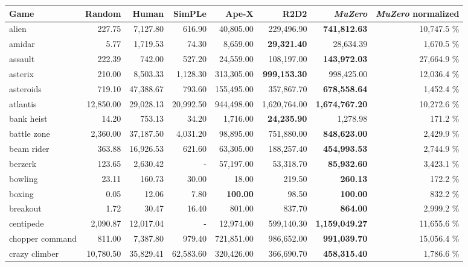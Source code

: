 \documentclass{article}
\newcommand{\muzero}{\emph{MuZero}}
\begin{document}
\begin{table}
\scriptsize

\begin{center}\begin{tabularx}{0.900000\textwidth}{X| r r r r r r r}
\toprule
Game & Random & Human & SimPLe \cite{kaiser:simple} & Ape-X \cite{apex} & R2D2 \cite{r2d2} & \muzero{} & \muzero{} normalized  \\
\midrule
alien &227.75 & 7,127.80 & 616.90 & 40,805.00 & 229,496.90 & \textbf{741,812.63} & 10,747.5 \%\\
amidar &5.77 & 1,719.53 & 74.30 & 8,659.00 & \textbf{29,321.40} & 28,634.39 & 1,670.5 \%\\
assault &222.39 & 742.00 & 527.20 & 24,559.00 & 108,197.00 & \textbf{143,972.03} & 27,664.9 \%\\
asterix &210.00 & 8,503.33 & 1,128.30 & 313,305.00 & \textbf{999,153.30} & 998,425.00 & 12,036.4 \%\\
asteroids &719.10 & 47,388.67 & 793.60 & 155,495.00 & 357,867.70 & \textbf{678,558.64} & 1,452.4 \%\\
atlantis &12,850.00 & 29,028.13 & 20,992.50 & 944,498.00 & 1,620,764.00 & \textbf{1,674,767.20} & 10,272.6 \%\\
bank heist &14.20 & 753.13 & 34.20 & 1,716.00 & \textbf{24,235.90} & 1,278.98 & 171.2 \%\\
battle zone &2,360.00 & 37,187.50 & 4,031.20 & 98,895.00 & 751,880.00 & \textbf{848,623.00} & 2,429.9 \%\\
beam rider &363.88 & 16,926.53 & 621.60 & 63,305.00 & 188,257.40 & \textbf{454,993.53} & 2,744.9 \%\\
berzerk &123.65 & 2,630.42 & - & 57,197.00 & 53,318.70 & \textbf{85,932.60} & 3,423.1 \%\\
bowling &23.11 & 160.73 & 30.00 & 18.00 & 219.50 & \textbf{260.13} & 172.2 \%\\
boxing &0.05 & 12.06 & 7.80 & \textbf{100.00} & 98.50 & \textbf{100.00} & 832.2 \%\\
breakout &1.72 & 30.47 & 16.40 & 801.00 & 837.70 & \textbf{864.00} & 2,999.2 \%\\
centipede &2,090.87 & 12,017.04 & - & 12,974.00 & 599,140.30 & \textbf{1,159,049.27} & 11,655.6 \%\\
chopper command &811.00 & 7,387.80 & 979.40 & 721,851.00 & 986,652.00 & \textbf{991,039.70} & 15,056.4 \%\\
crazy climber &10,780.50 & 35,829.41 & 62,583.60 & 320,426.00 & 366,690.70 & \textbf{458,315.40} & 1,786.6 \%\\

\end{tabularx}
\end{center}
\end{table}
\end{document}
